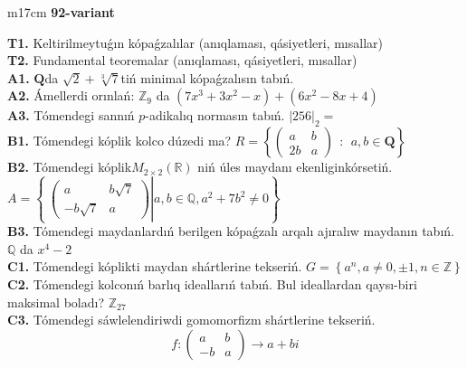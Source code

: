 \documentclass{article}
\begin{document}
\begin{tabular}{m{17cm}}
\textbf{92-variant}
\newline

\textbf{T1.} Keltirilmeytuǵın kópaǵzalılar (anıqlaması, qásiyetleri, mısallar) \\
\textbf{T2.} Fundamental teoremalar (anıqlaması, qásiyetleri, mısallar) \\
\textbf{A1.} \(\mathbf{Q}\)da \(\sqrt{2} + \sqrt[3]{7}\)tiń minimal kópaǵzalısın tabıń. \\
\textbf{A2.} Ámellerdi orınlań: \(\mathbb{Z}_{9}\) da \(\left( 7x^{3} + 3x^{2} - x \right) + \left( 6x^{2} - 8x + 4 \right)\) \\
\textbf{A3.} Tómendegi sannıń \(p\)-adikalıq normasın tabıń. \(|256|_{2} =\) \\
\textbf{B1.} Tómendegi kóplik kolco dúzedi ma? \(R = \left\{ \begin{pmatrix}
a & b \\
2b & a
\end{pmatrix}\ \ :\ \ a,b \in \mathbf{Q} \right\}\) \\
\textbf{B2.} Tómendegi kóplik\(M_{2 \times 2}\left( \mathbb{R} \right)\) niń úles maydanı ekenliginkórsetiń. \(A = \left\{ \left. \ \begin{pmatrix}
a & b\sqrt{7} \\
 - b\sqrt{7} & a
\end{pmatrix} \right|a,b\mathbb{\in Q},a^{2} + 7b^{2} \neq 0 \right\}\) \\
\textbf{B3.} Tómendegi maydanlardıń berilgen kópaǵzalı arqalı ajıralıw maydanın tabıń. \(\mathbb{Q}\) da \(x^{4} - 2\) \\
\textbf{C1.} Tómendegi kóplikti maydan shártlerine tekseriń. \(G = \left\{ a^{n},a \neq 0, \pm 1,n \in \mathbb{Z} \right\}\) \\
\textbf{C2.} Tómendegi kolconıń barlıq ideallarıń tabıń. Bul ideallardan qaysı-biri maksimal boladı? \(\mathbb{Z}_{27}\) \\
\textbf{C3.} Tómendegi sáwlelendiriwdi gomomorfizm shártlerine tekseriń.
\[f:\begin{pmatrix}
a & b \\
 - b & a
\end{pmatrix} \rightarrow a + bi\] \\

\end{tabular}
\vspace{1cm}
\end{document}
